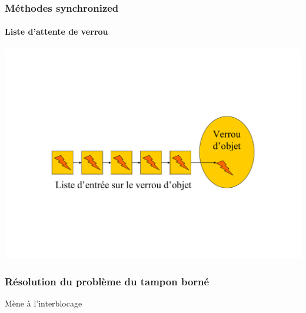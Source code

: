 \begin{frame}
\frametitle{Méthodes synchronized}
\framesubtitle{Liste d'attente de verrou}
\includegraphics[width=\textwidth]{../illustration/methode_synchronized.pdf}
\end{frame}

\begin{frame}
\frametitle{Résolution du problème du tampon borné}
\begin{scriptsize}\end{scriptsize}
\begin{center}
{\LARGE Mène à l'interblocage}
\end{center}
\end{frame}

